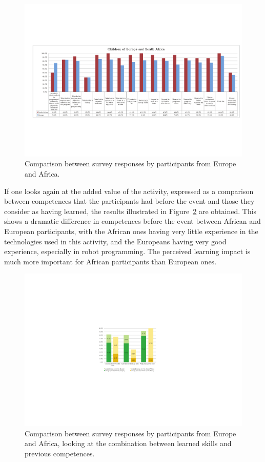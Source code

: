 \documentclass{intech-journal}
\begin{document}
\begin{figure}[ht]
 \centering
    \includegraphics[width=\columnwidth]{figures/all-eu-sa.pdf}
  \caption{Comparison between survey responses by participants from Europe and Africa.}
  \label{fig:EU-SA} 
\end{figure}

If one looks again at the added value of the activity, expressed as a comparison between competences that the participants had before the event and those they consider as having learned, the results illustrated in Figure~\ref{fig:EU-SA-learn} are obtained.
This shows a dramatic difference in competences before the event between African and European participants, with the African ones having very little experience in the technologies used in this activity, and the Europeans having very good experience, especially in robot programming. 
The perceived learning impact is much more important for African participants than European ones. 

\begin{figure}[ht]
 \centering
    \includegraphics[width=0.6\columnwidth]{figures/EU-SA-learned.pdf}
  \caption{Comparison between survey responses by participants from Europe and Africa, looking at the combination between learned skills and previous competences.}
  \label{fig:EU-SA-learn} 
\end{figure}
\end{document}
